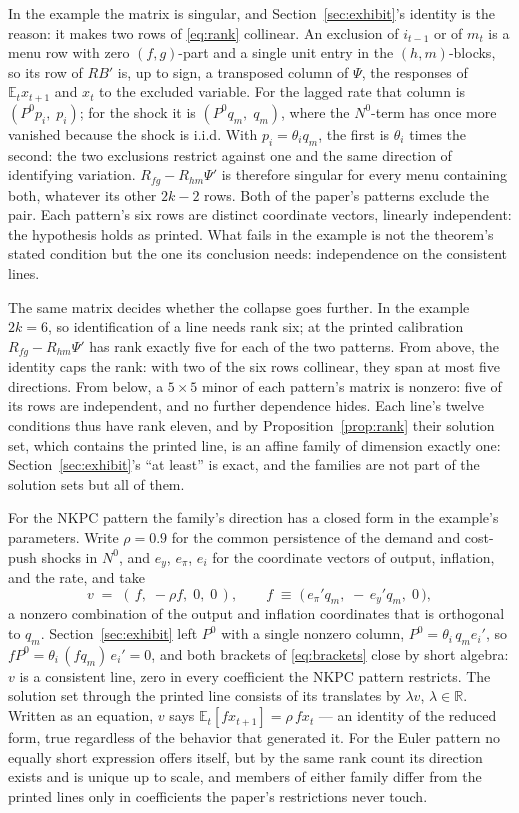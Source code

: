 \documentclass[11pt]{article}
\theoremstyle{remark}
\newcommand{\E}{\mathbb{E}}
\newcommand{\R}{\mathbb{R}}
\begin{document}
In the example the matrix is singular, and Section~\ref{sec:exhibit}'s identity is the reason: it makes two rows of \eqref{eq:rank} collinear. An exclusion of $i_{t-1}$ or of $m_t$ is a menu row with zero $(f,g)$-part and a single unit entry in the $(h,m)$-blocks, so its row of $RB'$ is, up to sign, a transposed column of $\Psi$, the responses of $\E_tx_{t+1}$ and $x_t$ to the excluded variable. For the lagged rate that column is $(P^0p_i,\;p_i)$; for the shock it is $(P^0q_m,\;q_m)$, where the $N^0$-term has once more vanished because the shock is i.i.d. With $p_i=\theta_iq_m$, the first is $\theta_i$ times the second: the two exclusions restrict against one and the same direction of identifying variation. $R_{fg}-R_{hm}\Psi'$ is therefore singular for every menu containing both, whatever its other $2k-2$ rows. Both of the paper's patterns exclude the pair. Each pattern's six rows are distinct coordinate vectors, linearly independent: the hypothesis holds as printed. What fails in the example is not the theorem's stated condition but the one its conclusion needs: independence on the consistent lines.

The same matrix decides whether the collapse goes further. In the example $2k=6$, so identification of a line needs rank six; at the printed calibration $R_{fg}-R_{hm}\Psi'$ has rank exactly five for each of the two patterns. From above, the identity caps the rank: with two of the six rows collinear, they span at most five directions. From below, a $5\times5$ minor of each pattern's matrix is nonzero: five of its rows are independent, and no further dependence hides. Each line's twelve conditions thus have rank eleven, and by Proposition~\ref{prop:rank} their solution set, which contains the printed line, is an affine family of dimension exactly one: Section~\ref{sec:exhibit}'s ``at least'' is exact, and the families are not part of the solution sets but all of them.

For the NKPC pattern the family's direction has a closed form in the example's parameters. Write $\rho=0.9$ for the common persistence of the demand and cost-push shocks in $N^0$, and $e_y$, $e_\pi$, $e_i$ for the coordinate vectors of output, inflation, and the rate, and take
\begin{equation}\label{eq:dir}
v\;=\;(\,f,\;-\rho f,\;0,\;0\,), \qquad f\;\equiv\;\bigl(\,e_\pi'q_m,\;-\,e_y'q_m,\;0\,\bigr),
\end{equation}
a nonzero combination of the output and inflation coordinates that is orthogonal to $q_m$. Section~\ref{sec:exhibit} left $P^0$ with a single nonzero column, $P^0=\theta_i\,q_m e_i'$, so $fP^0=\theta_i\,(fq_m)\,e_i'=0$, and both brackets of \eqref{eq:brackets} close by short algebra: $v$ is a consistent line, zero in every coefficient the NKPC pattern restricts. The solution set through the printed line consists of its translates by $\lambda v$, $\lambda\in\R$. Written as an equation, $v$ says $\E_t[fx_{t+1}]=\rho\,fx_t$ --- an identity of the reduced form, true regardless of the behavior that generated it. For the Euler pattern no equally short expression offers itself, but by the same rank count its direction exists and is unique up to scale, and members of either family differ from the printed lines only in coefficients the paper's restrictions never touch.
\end{document}
